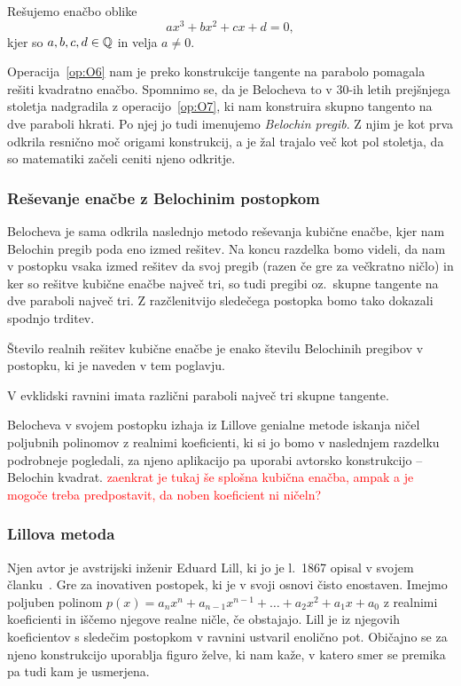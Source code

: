 Rešujemo enačbo oblike
$$ a x^3 + b x^2 + c x + d = 0, $$
kjer so $a, b, c, d \in \mathbb Q$ in velja $a \neq 0$.

Operacija~\ref{op:O6} nam je preko konstrukcije tangente na parabolo pomagala rešiti kvadratno enačbo. Spomnimo se, da je Belocheva to v 30-ih letih prejšnjega stoletja nadgradila z operacijo~\ref{op:O7}, ki nam konstruira skupno tangento na dve paraboli hkrati. Po njej jo tudi imenujemo \emph{Belochin pregib}. Z njim je kot prva odkrila resnično moč origami konstrukcij, a je žal trajalo več kot pol stoletja, da so matematiki začeli ceniti njeno odkritje.

\subsubsection{Reševanje enačbe z Belochinim postopkom}

Belocheva je sama odkrila naslednjo metodo reševanja kubične enačbe, kjer nam Belochin pregib poda eno izmed rešitev. Na koncu razdelka bomo videli, da nam v postopku vsaka izmed rešitev da svoj pregib (razen če gre za večkratno ničlo) in ker so rešitve kubične enačbe največ tri, so tudi pregibi oz.\ skupne tangente na dve paraboli največ tri. Z razčlenitvijo sledečega postopka bomo tako dokazali spodnjo trditev.

\begin{trditev}
    \label{trd:stevilo_skupnih_tangent}
    Število realnih rešitev kubične enačbe je enako številu Belochinih pregibov v postopku, ki je naveden v tem poglavju.
\end{trditev}

\begin{posledica}
    V evklidski ravnini imata različni paraboli največ tri skupne tangente.
\end{posledica}

Belocheva v svojem postopku izhaja iz Lillove genialne metode iskanja ničel poljubnih polinomov z realnimi koeficienti, ki si jo bomo v naslednjem razdelku podrobneje pogledali, za njeno aplikacijo pa uporabi avtorsko konstrukcijo -- Belochin kvadrat. \textcolor{red}{zaenkrat je tukaj še splošna kubična enačba, ampak a je mogoče treba predpostavit, da noben koeficient ni ničeln?}

\subsubsection*{Lillova metoda}

Njen avtor je avstrijski inženir Eduard Lill, ki jo je l.\ 1867 opisal v svojem članku~\cite{lill1867}. Gre za inovativen postopek, ki je v svoji osnovi čisto enostaven. Imejmo poljuben polinom $ p(x) = a_n x^n + a_{n-1} x^{n-1} + \ldots + a_2 x^2 + a_1 x + a_0 $ z realnimi koeficienti in iščemo njegove realne ničle, če obstajajo. Lill je iz njegovih koeficientov s sledečim postopkom v ravnini ustvaril enolično pot. Običajno se za njeno konstrukcijo uporablja figuro želve, ki nam kaže, v katero smer se premika pa tudi kam je usmerjena.


